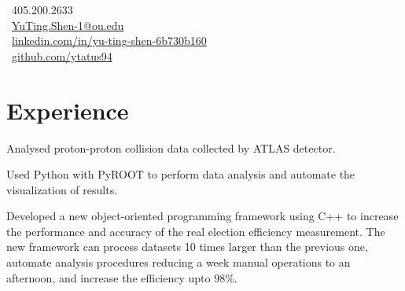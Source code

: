 \documentclass[letterpaper]{deedy-resume-openfont}
\begin{document}
%
%
\lastupdated

%
%

{
    \faPhone \ 405.200.2633\\
    \faEnvelope \ \href{mailto:YuTing.Shen-1@ou.edu}{YuTing.Shen-1@ou.edu}\\
    \faLinkedinSquare \ \href{https://www.linkedin.com/in/yu-ting-shen-6b730b160/}{linkedin.com/in/yu-ting-shen-6b730b160}\\
    \faGithub \ \href{https://github.com/ytatus94}{github.com/ytatus94}
}




\section{Experience}

\begin{tightemize}
\item Analysed proton-proton collision data collected by ATLAS detector.
\item Used Python with PyROOT to perform data analysis and automate the visualization of results.
\item Developed a new object-oriented programming framework using C++ to increase the performance and accuracy of the real election efficiency measurement. The new framework can process datasets 10 times larger than the previous one, automate analysis procedures reducing a week manual operations to an afternoon, and increase the efficiency upto 98\%.
\end{tightemize}
\sectionsep
\end{document}
